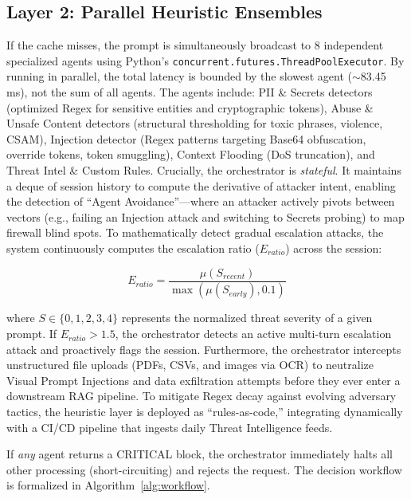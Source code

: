 \documentclass[conference]{IEEEtran}
\begin{document}
\subsection{Layer 2: Parallel Heuristic Ensembles}
If the cache misses, the prompt is simultaneously broadcast to 8 independent specialized agents using Python's \texttt{concurrent.futures.ThreadPoolExecutor}. By running in parallel, the total latency is bounded by the slowest agent ($\sim$83.45\,ms), not the sum of all agents. The agents include: PII \& Secrets detectors (optimized Regex for sensitive entities and cryptographic tokens), Abuse \& Unsafe Content detectors (structural thresholding for toxic phrases, violence, CSAM), Injection detector (Regex patterns targeting Base64 obfuscation, override tokens, token smuggling), Context Flooding (DoS truncation), and Threat Intel \& Custom Rules. Crucially, the orchestrator is \textit{stateful}. It maintains a deque of session history to compute the derivative of attacker intent, enabling the detection of ``Agent Avoidance''---where an attacker actively pivots between vectors (e.g., failing an Injection attack and switching to Secrets probing) to map firewall blind spots. To mathematically detect gradual escalation attacks, the system continuously computes the escalation ratio ($E_{ratio}$) across the session:

\begin{equation}
E_{ratio} = \frac{\mu(S_{recent})}{\max(\mu(S_{early}), 0.1)}
\end{equation}

where $S \in \{0,1,2,3,4\}$ represents the normalized threat severity of a given prompt. If $E_{ratio} > 1.5$, the orchestrator detects an active multi-turn escalation attack and proactively flags the session. Furthermore, the orchestrator intercepts unstructured file uploads (PDFs, CSVs, and images via OCR) to neutralize Visual Prompt Injections and data exfiltration attempts before they ever enter a downstream RAG pipeline. To mitigate Regex decay against evolving adversary tactics, the heuristic layer is deployed as ``rules-as-code,'' integrating dynamically with a CI/CD pipeline that ingests daily Threat Intelligence feeds.

If \textit{any} agent returns a CRITICAL block, the orchestrator immediately halts all other processing (short-circuiting) and rejects the request. The decision workflow is formalized in Algorithm~\ref{alg:workflow}.
\end{document}

